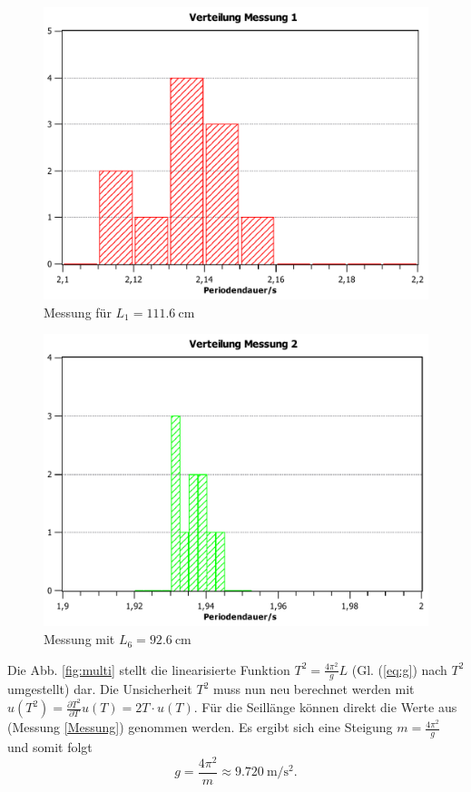 \documentclass[11pt,a4paper,titlepage, ngerman]{article}
\begin{document}
		\begin{figure}[ht]
			\centering
			\includegraphics[width=\textwidth]{VerteilungMessung1.pdf}
			\caption{Messung für $L_1 = \SI{111,6}{\centi\meter}$}
			\label{fig:Hist1}
		\end{figure}
		\begin{figure}[ht]
			\centering
			\includegraphics[width=\textwidth]{VerteilungMessung2.pdf}
			\caption{Messung mit $L_6 = \SI{92,6}{\centi\meter}$}
			\label{fig:Hist2}
		\end{figure}
			
		Die Abb. \ref{fig:multi} stellt die linearisierte Funktion $T^2 = \frac{4 \pi^2}{g} L$ (Gl. (\ref{eq:g}) nach $T^2$ umgestellt) dar.
		Die Unsicherheit $T^2$ muss nun neu berechnet werden mit $u(T^2) = \frac{\partial T^2}{\partial T} u(T) = 2 T \cdot u(T)$.
		Für die Seillänge können direkt die Werte aus (Messung \ref{Messung}) genommen werden.
		Es ergibt sich eine Steigung $m = \frac{4 \pi^2}{g}$ und somit folgt
		\begin{equation}
			g = \frac{4 \pi^2}{m} \approx \SI{9,720}{\meter\per\second\squared}.
		\end{equation}
			
\end{document}
